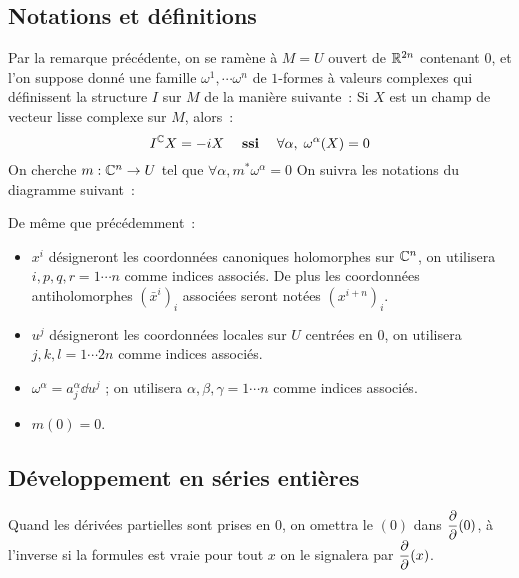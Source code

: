 \documentclass[a4paper,draft]{amsart}
\begin{document}
\subsection{Notations et définitions}
Par la remarque précédente, on se ramène à $M = U$ ouvert de $\mathbb{R}^{2n}$ contenant $0$, et l'on suppose donné une famille $\omega^1,\cdots \omega^n$ de $1$-formes à valeurs complexes qui définissent la structure $I$ sur $M$ de la manière suivante~: Si $X$ est un champ de vecteur lisse complexe sur $M$, alors~:
\[
I^{\mathbb{C}} X = -iX \quad \; \textbf{ssi} \; \quad \forall \alpha, \; \omega^\alpha(X) = 0
\]
On cherche $m : \mathbb{C}^n \rightarrow U$ tel que $\forall \alpha, m^* \omega^\alpha = 0$
On suivra les notations du diagramme suivant~:
\begin{center}\end{center}
De même que précédemment~:
\begin{itemize}
\item $x^i$ désigneront les coordonnées canoniques holomorphes sur $\mathbb{C}^{n}$, on utilisera $i,p,q,r = 1 \cdots n$ comme indices associés. De plus les coordonnées antiholomorphes $(\bar{x}^i)_i$ associées seront notées $(x^{i+n})_i$. 
\item $u^j$ désigneront les coordonnées locales sur $U$ centrées en $0$, on utilisera $j,k,l = 1 \cdots 2n$ comme indices associés.
\item $\omega^\alpha = a^\alpha_j \dd u^j$ ; on utilisera $\alpha, \beta, \gamma = 1 \cdots n$ comme indices associés.
\item $m(0) = 0$.
\end{itemize}


\subsection{Développement en séries entières}
Quand les dérivées partielles sont prises en $0$, on omettra le $(0)$ dans $\dfrac{\partial{}}{\partial{}}(0)$, à l'inverse si la formules est vraie pour tout $x$ on le signalera par $\dfrac{\partial{}}{\partial{}}(x)$.
\end{document}
